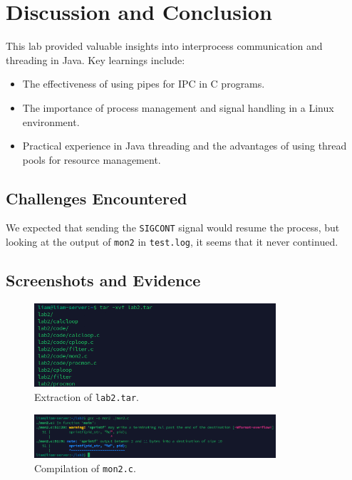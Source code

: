 \documentclass[a4paper,12pt]{article}
\begin{document}
\section{Discussion and Conclusion}
This lab provided valuable insights into interprocess communication and threading in Java. Key learnings include:
\begin{itemize}
    \item The effectiveness of using pipes for IPC in C programs.
    \item The importance of process management and signal handling in a Linux environment.
    \item Practical experience in Java threading and the advantages of using thread pools for resource management.
\end{itemize}

\subsection*{Challenges Encountered}
We expected that sending the \texttt{SIGCONT} signal would resume the process, but looking at the output of \texttt{mon2} in \texttt{test.log}, it seems that it never continued.

\subsection*{Screenshots and Evidence}
\begin{figure}[h]
    \centering
    \includegraphics[width=0.8\textwidth]{./lab2_extraction.png}
    \caption{Extraction of \texttt{lab2.tar}.}
\end{figure}

\begin{figure}[h]
    \centering
    \includegraphics[width=0.8\textwidth]{./mon2_compilation.png}
    \caption{Compilation of \texttt{mon2.c}.}
\end{figure}
\end{document}
